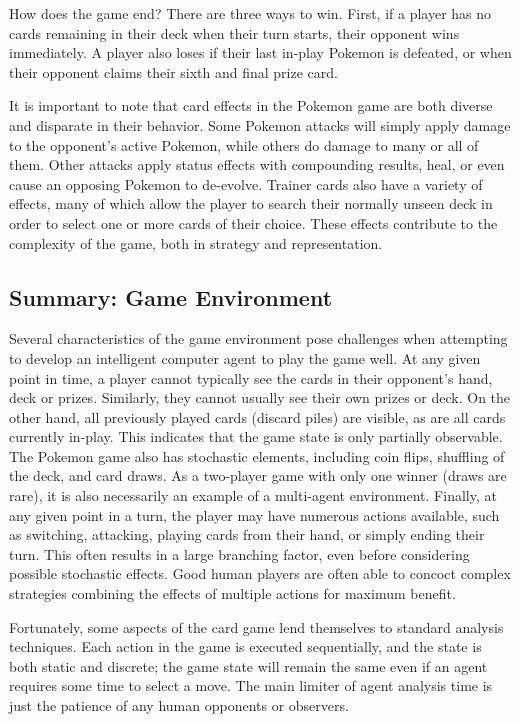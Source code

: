 \documentclass{article}
\begin{document}
How does the game end? There are three ways to win.  First, if a player has no cards remaining in their deck when their turn starts, their opponent wins immediately.  A player also loses if their last in-play Pokemon is defeated, or when their opponent claims their sixth and final prize card.\cite{pkmn}

It is important to note that card effects in the Pokemon game are both diverse and disparate in their behavior.  Some Pokemon attacks will simply apply damage to the opponent's active Pokemon, while others do damage to many or all of them.  Other attacks apply status effects with compounding results, heal, or even cause an opposing Pokemon to de-evolve.  Trainer cards also have a variety of effects, many of which allow the player to search their normally unseen deck in order to select one or more cards of their choice.  These effects contribute to the complexity of the game, both in strategy and representation.

\subsection{Summary: Game Environment} %

Several characteristics of the game environment pose challenges when attempting to develop an intelligent computer agent to play the game well.  At any given point in time, a player cannot typically see the cards in their opponent's hand, deck or prizes.  Similarly, they cannot usually see their own prizes or deck.  On the other hand, all previously played cards (discard piles) are visible, as are all cards currently in-play.  This indicates that the game state is only partially observable.  The Pokemon game also has stochastic elements, including coin flips, shuffling of the deck, and card draws.  As a two-player game with only one winner (draws are rare), it is also necessarily an example of a multi-agent environment.  Finally, at any given point in a turn, the player may have numerous actions available, such as switching, attacking, playing cards from their hand, or simply ending their turn.  This often results in a large branching factor, even before considering possible stochastic effects.  Good human players are often able to concoct complex strategies combining the effects of multiple actions for maximum benefit.

Fortunately, some aspects of the card game lend themselves to standard analysis techniques.  Each action in the game is executed sequentially, and the state is both static and discrete; the game state will remain the same even if an agent requires some time to select a move.  The main limiter of agent analysis time is just the patience of any human opponents or observers.
\end{document}
